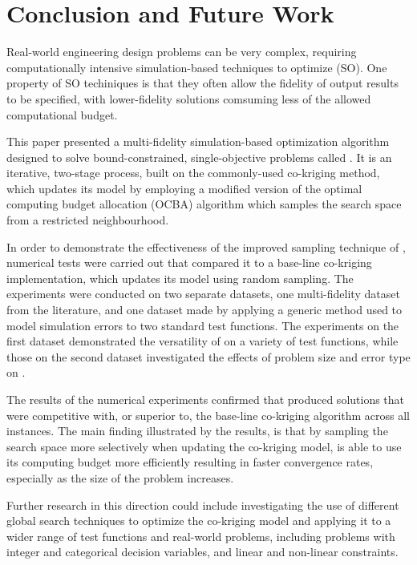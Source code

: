 \section{Conclusion and Future Work}\label{sec:conc}
Real-world engineering design problems can be very complex, requiring computationally intensive simulation-based techniques to optimize (SO). One property of SO techiniques is that they often allow the fidelity of output results to be specified, with lower-fidelity solutions comsuming less of the allowed computational budget.

This paper presented a multi-fidelity simulation-based optimization algorithm designed to solve bound-constrained, single-objective problems called \AlgName{}. It is an iterative, two-stage process, built on the commonly-used co-kriging method, which updates its model by employing a modified version of the optimal computing budget allocation (OCBA) algorithm which samples the search space from a restricted neighbourhood.  

In order to demonstrate the effectiveness of the improved sampling technique of \AlgName{}, numerical tests were carried out that compared it to a base-line co-kriging implementation, which updates its model using random sampling. The experiments were conducted on two separate datasets, one multi-fidelity dataset from the literature, and one dataset made by applying a generic method used to model simulation errors to two standard test functions. The experiments on the first dataset demonstrated the versatility of \AlgName{} on a variety of test functions, while those on the second dataset investigated the effects of problem size and error type on \AlgName{}.

The results of the numerical experiments confirmed that \AlgName{} produced solutions that were competitive with, or superior to, the base-line co-kriging algorithm across all instances. The main finding illustrated by the results, is that by sampling the search space more selectively when updating the co-kriging model, \AlgName{} is able to use its computing budget more efficiently resulting in faster convergence rates, especially as the size of the problem increases.

Further research in this direction could include investigating the use of different global search techniques to optimize the co-kriging model and applying it to a wider range of test functions and real-world problems, including problems with integer and categorical decision variables, and linear and non-linear constraints.